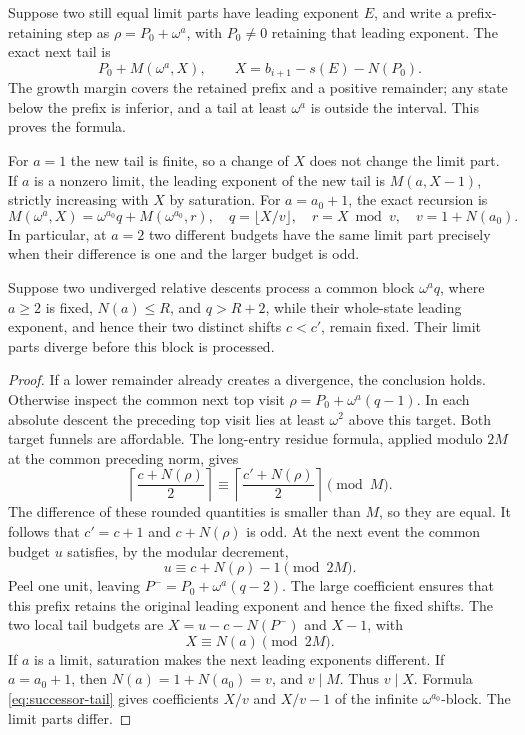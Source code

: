 Suppose two still equal limit parts have leading exponent \(E\), and
write a prefix-retaining step as
\(\rho=P_0+\omega^a\), with \(P_0\ne0\) retaining that leading
exponent. The exact next tail is
\begin{equation}\label{eq:local-phase}
 P_0+M(\omega^a,X),\qquad X=b_{i+1}-s(E)-N(P_0).
\end{equation}
The growth margin covers the retained prefix and a positive remainder;
any state below the prefix is inferior, and a tail at least
\(\omega^a\) is outside the interval. This proves the formula.

For \(a=1\) the new tail is finite, so a change of \(X\) does not
change the limit part. If \(a\) is a nonzero limit, the leading
exponent of the new tail is \(M(a,X-1)\), strictly increasing with
\(X\) by saturation. For \(a=a_0+1\), the exact recursion is
\begin{equation}\label{eq:successor-tail}
 M(\omega^a,X)=\omega^{a_0}q+M(\omega^{a_0},r),
 \quad q=\lfloor X/v\rfloor,\quad r=X\bmod v,
 \quad v=1+N(a_0).
\end{equation}
In particular, at \(a=2\) two different budgets have the same limit
part precisely when their difference is one and the larger budget is odd.

\begin{lemma}\label{lem:thick}
Suppose two undiverged relative descents process a common block
\(\omega^a q\), where \(a\ge2\) is fixed, \(N(a)\le R\), and
\(q>R+2\), while their whole-state leading exponent, and hence their
two distinct shifts \(c<c'\), remain fixed. Their limit parts diverge
before this block is processed.
\end{lemma}
\begin{proof}
If a lower remainder already creates a divergence, the conclusion holds.
Otherwise inspect the common next top visit
\(\rho=P_0+\omega^a(q-1)\). In each absolute descent the preceding
top visit lies at least \(\omega^2\) above this target. Both target
funnels are affordable. The long-entry residue formula, applied modulo
\(2M\) at the common preceding norm, gives
\[
 \left\lceil\frac{c+N(\rho)}2\right\rceil
 \equiv
 \left\lceil\frac{c'+N(\rho)}2\right\rceil\pmod M.
\]
The difference of these rounded quantities is smaller than \(M\),
so they are equal. It follows that \(c'=c+1\) and
\(c+N(\rho)\) is odd. At the next event the common budget \(u\)
satisfies, by the modular decrement,
\[
 u\equiv c+N(\rho)-1\pmod{2M}.
\]
Peel one unit, leaving \(P^-=P_0+\omega^a(q-2)\). The large
coefficient ensures that this prefix retains the original leading
exponent and hence the fixed shifts. The two local tail budgets are
\(X=u-c-N(P^-)\) and \(X-1\), with
\[
 X\equiv N(a)\pmod{2M}.
\]
If \(a\) is a limit, saturation makes the next leading exponents
different. If \(a=a_0+1\), then \(N(a)=1+N(a_0)=v\), and
\(v\mid M\). Thus \(v\mid X\). Formula
\eqref{eq:successor-tail} gives coefficients \(X/v\) and \(X/v-1\)
of the infinite \(\omega^{a_0}\)-block. The limit parts differ.
\end{proof}

